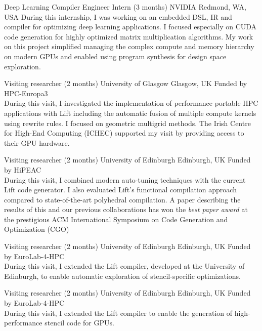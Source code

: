 \documentclass[11pt,a4paper]{moderncv}
\begin{document}
					{Deep Learning Compiler Engineer Intern (3 months)}
					{NVIDIA}
					{Redmond, WA, USA}{}
					{
                    During this internship, I was working on an embedded DSL, IR and compiler for optimizing deep learning applications.
                    I focused especially on CUDA code generation for highly optimized matrix multiplication algorithms.
                    My work on this project simplified managing the complex compute and memory hierarchy on modern GPUs and enabled using program synthesis for design space exploration.
                    }

					{Visiting researcher (2 months)}
					{University of Glasgow}
					{Glasgow, UK}{}
					{Funded by HPC-Europa3\\
                     During this visit, I investigated the implementation of performance portable HPC applications with Lift including the automatic fusion of multiple compute kernels using rewrite rules.
                     I focused on geometric multigrid methods. The Irish Centre for High-End Computing (ICHEC) supported my visit by providing access to their GPU hardware.
					}

					{Visiting researcher (2 months)}
					{University of Edinburgh}
					{Edinburgh, UK}{}
					{Funded by HiPEAC\\
                     During this visit, I combined modern auto-tuning techniques with the current Lift code generator.
                     I also evaluated Lift's functional compilation approach compared to state-of-the-art polyhedral compilation.
                     A paper describing the results of this and our previous collaborations has won the \textit{best paper award} at the prestigious ACM International Symposium on Code Generation and Optimization (CGO)~\cite{cgo2018}
					}

					{Visiting researcher (2 months)}
					{University of Edinburgh}
					{Edinburgh, UK}{}
					{Funded by EuroLab-4-HPC\\
					 During this visit, I extended the Lift compiler, developed at the
					 University of Edinburgh, to enable automatic exploration of stencil-specific optimizations.
					}

					{Visiting researcher (2 months)}
					{University of Edinburgh}
					{Edinburgh, UK}{}
					{Funded by EuroLab-4-HPC\\
					 During this visit, I extended the Lift compiler to enable the generation of
					 high-performance stencil code for GPUs.
					}
\end{document}
